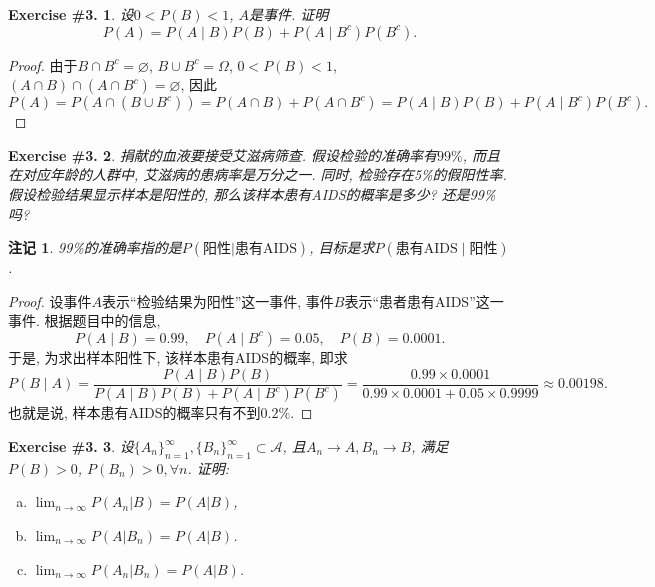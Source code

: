 \documentclass[UTF8, a4paper]{article}
\newtheorem{exercise}{Exercise \#3.}
\newtheorem*{remark}{注记}
\begin{document}
\begin{framed}
\begin{exercise}
    设\(0 < P(B) < 1\), \(A\)是事件. 证明$$
P(A)=P(A \mid B) P(B)+P\left(A \mid B^c\right) P\left(B^c\right).
$$
\end{exercise}
\end{framed}

\begin{proof}
由于\(B\cap B^c = \varnothing\), \(B \cup B^c = \Omega\), \(0<P(B)<1\), \((A\cap B) \cap (A \cap B^c) = \varnothing\), 因此
$$
P(A)= P(A \cap (B \cup B^c)) = P(A \cap B) + P(A \cap B^c) = P(A \mid B)P(B) + P(A \mid B^c)P(B^c).
$$
\end{proof}


\begin{framed}
\begin{exercise}
    捐献的血液要接受艾滋病筛查. 假设检验的准确率有\(99\%\), 而且在对应年龄的人群中, 艾滋病的患病率是万分之一. 
    同时, 检验存在5\%的假阳性率.
    假设检验结果显示样本是阳性的, 那么该样本患有AIDS的概率是多少? 还是99\%吗?
\end{exercise}
\end{framed}

\begin{remark}
99\%的准确率指的是\(P(\text{阳性} | \text{患有AIDS})\), 目标是求\(P(\text{患有AIDS} \mid \text{阳性})\).
\end{remark}

\begin{proof}
设事件\(A\)表示``检验结果为阳性''这一事件, 事件\(B\)表示``患者患有AIDS''这一事件. 根据题目中的信息, 
$$
P(A \mid B) = 0.99, \quad P(A \mid B^c) = 0.05, \quad P(B) = 0.0001.
$$
于是, 为求出样本阳性下, 该样本患有AIDS的概率, 即求
$$
P(B \mid A) = \frac{P(A \mid B) P(B)}{P(A \mid B)P(B) + P(A \mid B^c) P(B^c)} = \frac{0.99 \times 0.0001}{0.99 \times 0.0001 + 0.05 \times 0.9999} \approx 0.00198.
$$
也就是说, 样本患有AIDS的概率只有不到\(0.2\%\).
\end{proof}


\begin{framed}
\begin{exercise}
    设\(\{A_n\}_{n = 1}^\infty, \{B_n\}_{n = 1}^\infty \subset \mathcal{A}\), 且\(A_n \to A, B_n \to B\), 满足\(P(B) > 0\), \(P(B_n) > 0, \forall n\).
    证明:
    \begin{enumerate}[a)]
        \item \(\lim_{n \to \infty} P(A_n |B) = P(A|B)\),
        \item \(\lim_{n\to \infty}P(A|B_n) = P(A|B)\).
        \item \(\lim_{n\to \infty}P(A_n | B_n) = P(A|B)\).
    \end{enumerate}
\end{exercise}
\end{framed}
\end{document}
